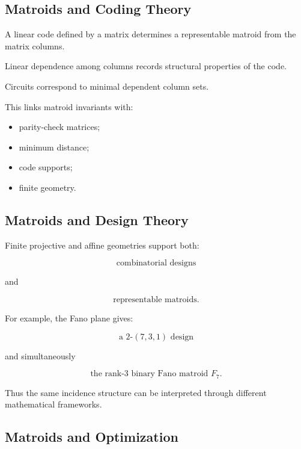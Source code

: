 \subsection{Matroids and Coding Theory}
\label{subsec:matroids-coding-theory}

A linear code defined by a matrix determines a representable matroid
from the matrix columns.

Linear dependence among columns records structural properties of the
code.

Circuits correspond to minimal dependent column sets.

This links matroid invariants with:

\begin{itemize}
    \item parity-check matrices;
    \item minimum distance;
    \item code supports;
    \item finite geometry.
\end{itemize}

\subsection{Matroids and Design Theory}
\label{subsec:matroids-design-theory}

Finite projective and affine geometries support both:

\[
\text{combinatorial designs}
\]

and

\[
\text{representable matroids}.
\]

For example, the Fano plane gives:

\[
\boxed{
\text{a }2\text{-}(7,3,1)\text{ design}
}
\]

and simultaneously

\[
\boxed{
\text{the rank-3 binary Fano matroid }F_7.
}
\]

Thus the same incidence structure can be interpreted through different
mathematical frameworks.

\subsection{Matroids and Optimization}
\label{subsec:matroids-optimization}

